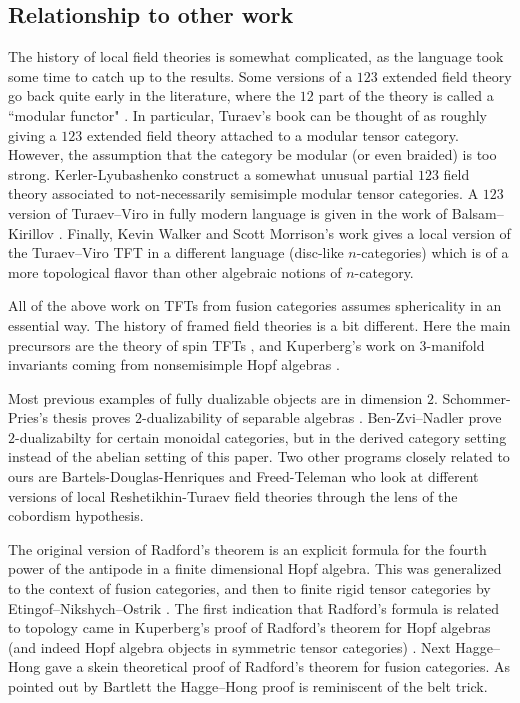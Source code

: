 \documentclass{amsart}
\begin{document}
\subsection{Relationship to other work}

The history of local field theories is somewhat complicated, as the language took some time to catch up to the results.  Some versions of a $123$ extended field theory go back quite early in the literature, where the $12$ part of the theory is called a ``modular functor" \cite{Segal, MR1002038, MR1159969,MR1797619}.  In particular, Turaev's book \cite{MR1292673} can be thought of as roughly giving a $123$ extended field theory attached to a modular tensor category.  However, the assumption that the category be modular (or even braided) is too strong.  Kerler-Lyubashenko \cite{MR1862634} construct a somewhat unusual partial $123$ field theory associated to not-necessarily semisimple modular tensor categories.   A $123$ version of Turaev--Viro in fully modern language is given in the work of Balsam--Kirillov \cite{1004.1533}.  Finally, Kevin Walker and Scott Morrison's work \cite{kw:tqft, 1009.5025} gives a local version of the Turaev--Viro TFT in a different language (disc-like $n$-categories) which is of a more topological flavor than other algebraic notions of $n$-category.

All of the above work on TFTs from fusion categories assumes sphericality in an essential way.  The history of framed field theories is a bit different.  Here the main precursors are the theory of spin TFTs \cite{MR1117149, MR1171303, MR1387228, MR1880321}, and Kuperberg's work on $3$-manifold invariants coming from nonsemisimple Hopf algebras \cite{MR1394749}.

Most previous examples of fully dualizable objects are in dimension $2$.  Schommer-Pries's thesis proves $2$-dualizability of separable algebras \cite{???}.    Ben-Zvi--Nadler \cite{???} prove $2$-dualizabilty for certain monoidal categories, but in the derived category setting instead of the abelian setting of this paper.   Two other programs closely related to ours are Bartels-Douglas-Henriques \cite{???} and Freed-Teleman \cite{???} who look at different versions of local Reshetikhin-Turaev field theories through the lens of the cobordism hypothesis.

The original version of Radford's theorem \cite{MR0407069} is an explicit formula for the fourth power of the antipode in a finite dimensional Hopf algebra.  This was generalized to the context of fusion categories, and then to finite rigid tensor categories by Etingof--Nikshych--Ostrik \cite{MR2183279,MR2097289}.  The first indication that Radford's formula is related to topology came in Kuperberg's proof of Radford's theorem for Hopf algebras (and indeed Hopf algebra objects in symmetric tensor categories) \cite{MR1394749}.  Next Hagge--Hong \cite{MR2559711} gave a skein theoretical proof of Radford's theorem for fusion categories.  As pointed out by Bartlett \cite{0901.3975} the Hagge--Hong proof is reminiscent of the belt trick.
\end{document}
